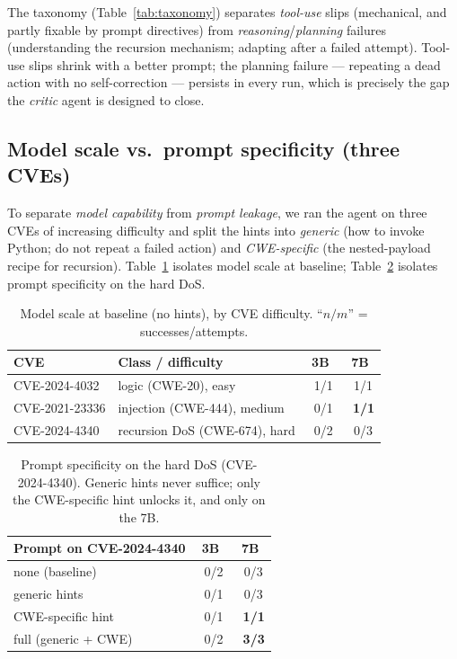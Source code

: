 \documentclass[conference,10pt,a4paper]{IEEEtran}
\newcommand{\yes}{\textcolor{ok}{\checkmark}}
\newcommand{\no}{\textcolor{bad}{\texttimes}}
\begin{document}
The taxonomy (Table~\ref{tab:taxonomy}) separates \textit{tool-use} slips (mechanical, and partly fixable by prompt directives) from \textit{reasoning}/\textit{planning} failures (understanding the recursion mechanism; adapting after a failed attempt). Tool-use slips shrink with a better prompt; the planning failure --- repeating a dead action with no self-correction --- persists in every run, which is precisely the gap the \textit{critic} agent is designed to close.

\subsection{Model scale vs.\ prompt specificity (three CVEs)}
To separate \textit{model capability} from \textit{prompt leakage}, we ran the agent on three CVEs of increasing difficulty and split the hints into \textit{generic} (how to invoke Python; do not repeat a failed action) and \textit{CWE-specific} (the nested-payload recipe for recursion). Table~\ref{tab:thresh} isolates model scale at baseline; Table~\ref{tab:prompt} isolates prompt specificity on the hard DoS.

\begin{table}[t]
\caption{Model scale at baseline (no hints), by CVE difficulty. ``$n/m$'' = successes/attempts.}
\label{tab:thresh}
\centering\footnotesize
\begin{tabular}{@{}llcc@{}}
\toprule
CVE & Class / difficulty & 3B & 7B \\ \midrule
CVE-2024-4032 & logic (CWE-20), easy & \yes\ 1/1 & \yes\ 1/1 \\
CVE-2021-23336 & injection (CWE-444), medium & \no\ 0/1 & \textbf{\yes\ 1/1} \\
CVE-2024-4340 & recursion DoS (CWE-674), hard & \no\ 0/2 & \no\ 0/3 \\ \bottomrule
\end{tabular}
\end{table}

\begin{table}[t]
\caption{Prompt specificity on the hard DoS (CVE-2024-4340). Generic hints never suffice; only the CWE-specific hint unlocks it, and only on the 7B.}
\label{tab:prompt}
\centering\footnotesize
\begin{tabular}{@{}lcc@{}}
\toprule
Prompt on CVE-2024-4340 & 3B & 7B \\ \midrule
none (baseline) & \no\ 0/2 & \no\ 0/3 \\
generic hints & \no\ 0/1 & \no\ 0/3 \\
CWE-specific hint & \no\ 0/1 & \textbf{\yes\ 1/1} \\
full (generic + CWE) & \no\ 0/2 & \textbf{\yes\ 3/3} \\ \bottomrule
\end{tabular}
\end{table}
\end{document}
